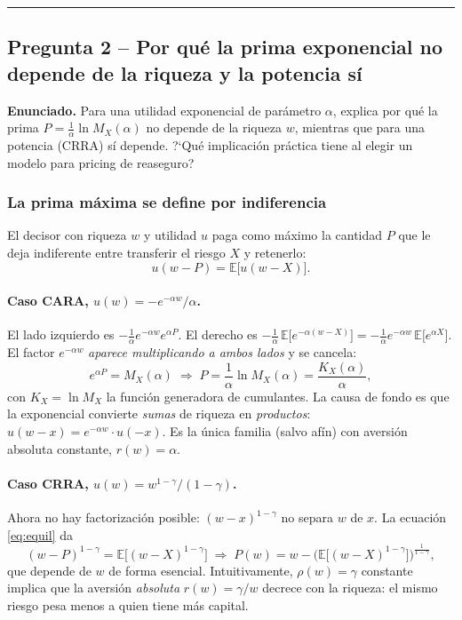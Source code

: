 \documentclass[a4paper,12pt]{article}
\newcommand{\E}{\mathbb{E}}
\begin{document}
\bigskip\hrule\bigskip

\subsection{Pregunta 2 -- Por qu\'e la prima exponencial no depende de la riqueza y la potencia s\'i}

\noindent\textbf{Enunciado.} Para una utilidad exponencial de par\'ametro $\alpha$, explica por qu\'e la prima $P=\frac1\alpha\ln M_X(\alpha)$ no depende de la riqueza $w$, mientras que para una potencia (CRRA) s\'i depende. ?`Qu\'e implicaci\'on pr\'actica tiene al elegir un modelo para pricing de reaseguro?

\subsubsection*{La prima m\'axima se define por indiferencia}
El decisor con riqueza $w$ y utilidad $u$ paga como m\'aximo la cantidad $P$ que le deja indiferente entre transferir el riesgo $X$ y retenerlo:
\begin{equation}\label{eq:equil}
u(w-P)=\E\big[u(w-X)\big].
\end{equation}

\paragraph{Caso CARA, $u(w)=-e^{-\alpha w}/\alpha$.} El lado izquierdo es $-\frac1\alpha e^{-\alpha w}e^{\alpha P}$. El derecho es $-\frac1\alpha\,\E\big[e^{-\alpha(w-X)}\big]=-\frac1\alpha e^{-\alpha w}\,\E\big[e^{\alpha X}\big]$. El factor $e^{-\alpha w}$ \emph{aparece multiplicando a ambos lados} y se cancela:
\[
e^{\alpha P}=M_X(\alpha)\;\Longrightarrow\;P=\frac1\alpha\ln M_X(\alpha)=\frac{K_X(\alpha)}{\alpha},
\]
con $K_X=\ln M_X$ la funci\'on generadora de cumulantes. La causa de fondo es que la exponencial convierte \emph{sumas} de riqueza en \emph{productos}: $u(w-x)=e^{-\alpha w}\cdot u(-x)$. Es la \'unica familia (salvo af\'in) con aversi\'on absoluta constante, $r(w)=\alpha$.

\paragraph{Caso CRRA, $u(w)=w^{1-\gamma}/(1-\gamma)$.} Ahora no hay factorizaci\'on posible: $(w-x)^{1-\gamma}$ no separa $w$ de $x$. La ecuaci\'on \eqref{eq:equil} da
\[
(w-P)^{1-\gamma}=\E\big[(w-X)^{1-\gamma}\big]\;\Longrightarrow\;P(w)=w-\Big(\E\big[(w-X)^{1-\gamma}\big]\Big)^{\frac1{1-\gamma}},
\]
que depende de $w$ de forma esencial. Intuitivamente, $\rho(w)=\gamma$ constante implica que la aversi\'on \emph{absoluta} $r(w)=\gamma/w$ decrece con la riqueza: el mismo riesgo pesa menos a quien tiene m\'as capital.
\end{document}
